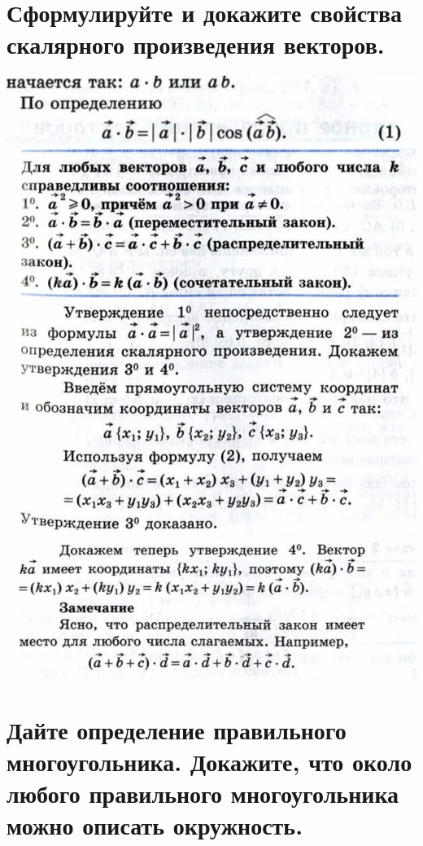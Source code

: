 \documentclass[12pt, letterpaper]{article}
\begin{document}
\section {Сформулируйте и докажите свойства скалярного произведения векторов.}
\includegraphics[scale=0.3]{photo.jpg} \\
\includegraphics[scale=0.3]{photo1.jpg} \\
\includegraphics[scale=0.3]{photo3.jpg} \\

\section {Дайте определение правильного многоугольника. Докажите, что около любого правильного многоугольника можно описать окружность.}
\end{document}
